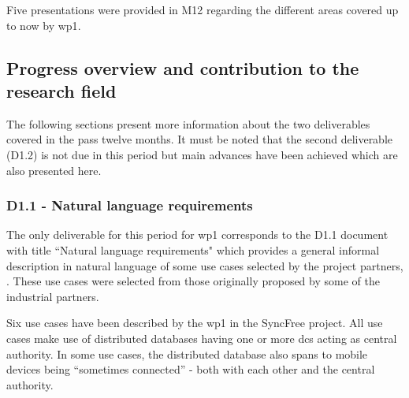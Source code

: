 \documentclass[12pt,twoside]{article}
\begin{document}
Five presentations were provided in M12 regarding the different areas covered up to now by \gls{wp1}.


\subsection{Progress overview and contribution to the research field}
The following sections present more information about the two deliverables covered in the pass twelve months. It must be noted that the second deliverable (D1.2) is not due in this period but main advances have been achieved which are also presented here.


\subsubsection{D1.1 - Natural language requirements}
The only deliverable for this period for \gls{wp1} corresponds to the D1.1 document with title ``Natural language requirements" which provides a general informal description in natural language of some use cases selected by the project partners, \cite{Benedictus2014a}. These use cases were selected from those originally proposed by some of the industrial partners.

Six use cases have been described by the \gls{wp1} in the SyncFree project. All use cases make use of distributed databases having one or more \glspl{dc} acting as central authority. In some use cases, the distributed database also spans to mobile devices being “sometimes connected” - both with each other and the central authority. 
\end{document}
